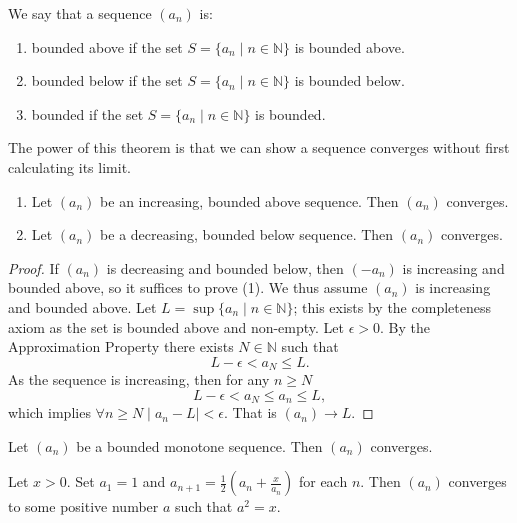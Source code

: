 \documentclass[11pt]{article}
\begin{document}
\begin{definition}\label{2.3.3}
    We say that a sequence $(a_n)$ is:
    \begin{enumerate}
        \item bounded above if the set $S = \{a_n \mid n \in \mathbb{N}\}$ is bounded above.
        \item bounded below if the set $S = \{a_n \mid n \in \mathbb{N}\}$ is bounded below.
        \item bounded if the set $S = \{a_n \mid n \in \mathbb{N}\}$ is bounded.
    \end{enumerate}
\end{definition}

\begin{theorem} \label{2.3.4}
    The power of this theorem is that we can show a sequence converges without first calculating its limit.
    \begin{enumerate}
        \item Let $(a_n)$ be an increasing, bounded above sequence. Then $(a_n)$ converges.
        \item Let $(a_n)$ be a decreasing, bounded below sequence. Then $(a_n)$ converges.
    \end{enumerate}
\end{theorem}

\begin{proof}
    If $(a_n)$ is decreasing and bounded below, then $(-a_n)$ is increasing and bounded above, so it suffices to prove (1). We thus assume $(a_n)$ is increasing and bounded above.
    Let $L = \sup \{a_n \mid n \in \mathbb{N}\}$; this exists by the completeness axiom as the set is bounded above and non-empty. Let $\epsilon > 0$. By the Approximation Property there exists $N \in \mathbb{N}$ such that
    \[
        L - \epsilon < a_N \leq L.
    \]
    As the sequence is increasing, then for any $n \geq N$
    \[
        L - \epsilon < a_N \leq a_n \leq L,
    \]
    which implies $\forall n \geq N \mid a_n - L \mid < \epsilon$. That is $(a_n)
        \to L$.
\end{proof}

\begin{corollary}\label{2.3.5}
    Let $(a_n)$ be a bounded monotone sequence. Then $(a_n)$ converges.
\end{corollary}

\begin{example}\label{2.3.6}
    Let $x > 0$. Set $a_1 = 1$ and $a_{n+1} = \frac{1}{2} \left( a_n + \frac{x}{a_n} \right)$ for each $n$. Then $(a_n)$ converges to some positive number $a$ such that $a^2 = x$.
\end{example}
\end{document}
